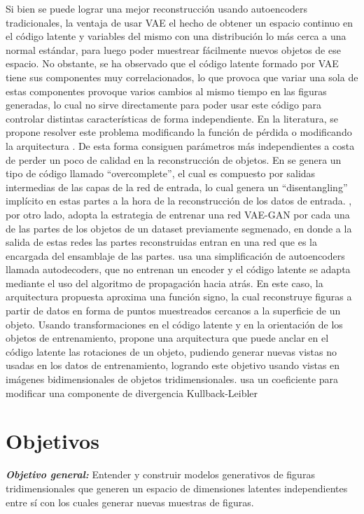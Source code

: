 \documentclass[spanish]{article}
\begin{document}
Si bien se puede lograr una mejor reconstrucción usando autoencoders tradicionales, la ventaja de usar VAE el hecho de obtener un espacio continuo en el código latente y variables del mismo con una distribución lo más cerca a una normal estándar, para luego poder muestrear fácilmente nuevos objetos de ese espacio. No obstante, se ha observado que el código latente formado por VAE tiene sus componentes muy correlacionados, lo que provoca que variar una sola de estas componentes provoque varios cambios al mismo tiempo en las figuras generadas, lo cual no sirve directamente para poder usar este código para controlar distintas características de forma independiente. En la literatura, se propone resolver este problema modificando la función de pérdida \cite{Higgins2017} o modificando la arquitectura \cite{Li2019, Yin2019}. De esta forma consiguen parámetros más independientes a costa de perder un poco de calidad en la reconstrucción de objetos. En \cite{Yin2019} se genera un tipo de código llamado ``overcomplete'', el cual es compuesto por salidas intermedias de las capas de la red de entrada, lo cual genera un ``disentangling'' implícito en estas partes a la hora de la reconstrucción de los datos de entrada. \cite{Li2019}, por otro lado, adopta la estrategia de entrenar una red VAE-GAN por cada una de las partes de los objetos de un dataset previamente segmenado, en donde a la salida de estas redes las partes reconstruidas entran en una red que es la encargada del ensamblaje de las partes. \cite{Park2019} usa una simplificación de autoencoders llamada autodecoders, que no entrenan un encoder y el código latente se adapta mediante el uso del algoritmo de propagación hacia atrás. En este caso, la arquitectura propuesta aproxima una función signo, la cual reconstruye figuras a partir de datos en forma de puntos muestreados cercanos a la superficie de un objeto. Usando transformaciones en el código latente y en la orientación de los objetos de entrenamiento, \cite{Olszewski2019} propone una arquitectura que puede anclar en el código latente las rotaciones de un objeto, pudiendo generar nuevas vistas no usadas en los datos de entrenamiento, logrando este objetivo usando vistas en imágenes bidimensionales de objetos tridimensionales. \cite{Higgins2017} usa un coeficiente para modificar una componente de divergencia Kullback-Leibler

\section{Objetivos}
\textbf{\textit{Objetivo general:}} Entender y construir modelos generativos de figuras tridimensionales que generen un espacio de dimensiones latentes independientes entre sí con los cuales generar nuevas muestras de figuras.
\end{document}
